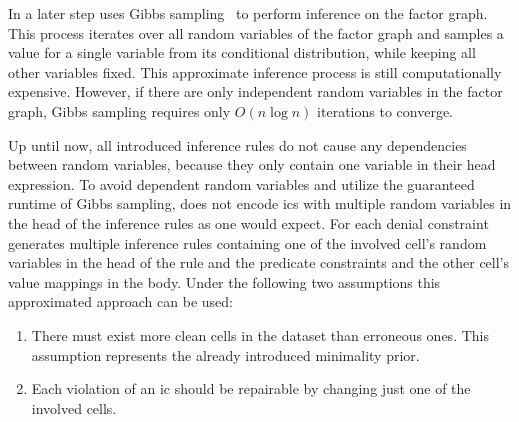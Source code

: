   In a later step \holoclean{} uses Gibbs sampling~\cite{gibbssampling} to perform inference on the factor graph.
  This process iterates over all random variables of the factor graph and samples a value for a single variable from its conditional distribution, while keeping all other variables fixed.
  This approximate inference process is still computationally expensive.
  However, if there are only independent random variables in the factor graph, Gibbs sampling requires only $O(n \log n)$ iterations to converge.
  
  Up until now, all introduced inference rules do not cause any dependencies between random variables, because they only contain one variable in their head expression.
  To avoid dependent random variables and utilize the guaranteed runtime of Gibbs sampling, \holoclean{} does not encode \glspl{ic} with multiple random variables in the head of the inference rules as one would expect.
  For each denial constraint \holoclean{} generates multiple inference rules containing one of the involved cell's random variables in the head of the rule and the predicate constraints and the other cell's value mappings in the body.
  Under the following two assumptions this approximated approach can be used:
  \begin{enumerate}
    \item There must exist more clean cells in the dataset than erroneous ones. This assumption represents the already introduced minimality prior.
    \item Each violation of an \gls{ic} should be repairable by changing just one of the involved cells.
  \end{enumerate}
  
